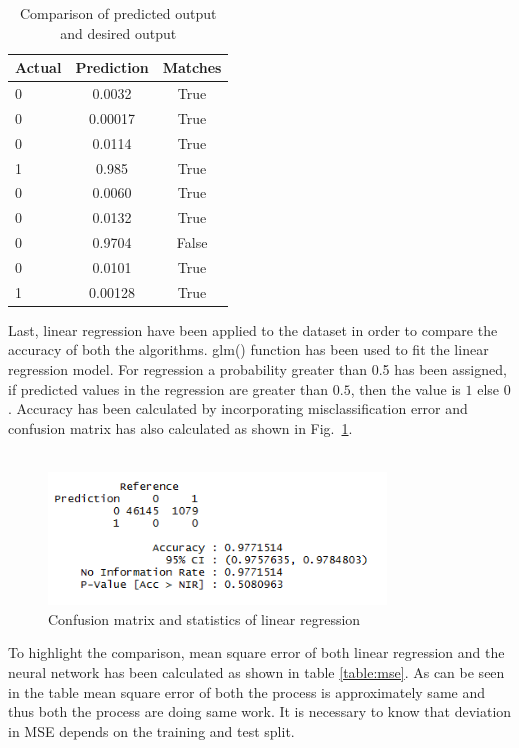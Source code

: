 \documentclass{article}[]
\begin{document}
\begin{table} 
\caption{Comparison of predicted output and desired output} %
\centering      %
\begin{tabular}{l|c|c}  %
\hline                      %
{\bf Actual}&{\bf Prediction}&{\bf Matches}\\
\hline                    %
0 & 0.0032 & True\\
0 & 0.00017 & True\\
0 & 0.0114 & True\\
1 & 0.985 & True\\
0 & 0.0060 & True\\
0 & 0.0132 & True\\
0 & 0.9704 & False\\
0 & 0.0101 & True\\
1 & 0.00128 & True\\
\hline     %
\end{tabular} 
\label{table:result} 
\end{table}
Last, linear regression \cite{laitinen1999predicting} have been applied to the dataset in order to compare the accuracy of both the algorithms. glm() function has been used to fit the linear regression model. For regression a probability greater than 0.5 has been assigned, if predicted values in the regression are greater than $0.5$, then the value is $1$ else $0$. Accuracy has been calculated by incorporating misclassification error and confusion matrix has also calculated as shown in Fig.~\ref{fig:image5}.\\\\
\begin{figure}[!htb]
\centering
\includegraphics[width=0.8\textwidth]{image5.png}
\caption{Confusion matrix and statistics of linear regression}
\label{fig:image5}
\end{figure}
To highlight the comparison, mean square error of both linear regression and the neural network has been calculated as shown in table \ref{table:mse}. As can be seen in the table mean square error of both the process is approximately same and thus both the process are doing same work. It is necessary to know that deviation in MSE depends on the training and test split.  
\end{document}
